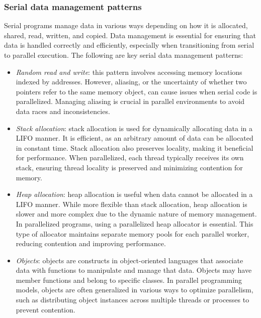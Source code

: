 \subsubsection{Serial data management patterns}
Serial programs manage data in various ways depending on how it is allocated, shared, read, written, and copied.
Data management is essential for ensuring that data is handled correctly and efficiently, especially when transitioning from serial to parallel execution.
The following are key serial data management patterns:
\begin{itemize}
    \item \textit{Random read and write}: this pattern involves accessing memory locations indexed by addresses. 
        However, aliasing, or the uncertainty of whether two pointers refer to the same memory object, can cause issues when serial code is parallelized.
        Managing aliasing is crucial in parallel environments to avoid data races and inconsistencies.
    \item \textit{Stack allocation}: stack allocation is used for dynamically allocating data in a LIFO manner. 
        It is efficient, as an arbitrary amount of data can be allocated in constant time. 
        Stack allocation also preserves locality, making it beneficial for performance. 
        When parallelized, each thread typically receives its own stack, ensuring thread locality is preserved and minimizing contention for memory.
    \item \textit{Heap allocation}: heap allocation is useful when data cannot be allocated in a LIFO manner. 
        While more flexible than stack allocation, heap allocation is slower and more complex due to the dynamic nature of memory management. 
        In parallelized programs, using a parallelized heap allocator is essential. This type of allocator maintains separate memory pools for each parallel worker, reducing contention and improving performance.
    \item \textit{Objects}: objects are constructs in object-oriented languages that associate data with functions to manipulate and manage that data.
        Objects may have member functions and belong to specific classes. 
        In parallel programming models, objects are often generalized in various ways to optimize parallelism, such as distributing object instances across multiple threads or processes to prevent contention.
\end{itemize}


